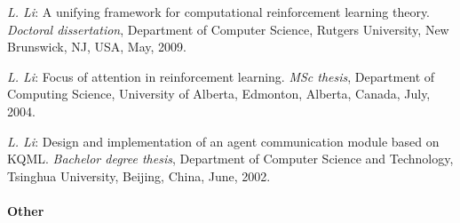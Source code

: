 \documentclass[10pt,twoside,letterpaper]{article}
\newcommand{\selffont}[1]{{\textit{#1}}}
\newcommand{\venuefont}[1]{{\textit{#1}}}
\newcommand{\negitemspace}{\vspace{1mm}}
\newcommand{\myself}{\selffont{L. Li}}
\begin{document}
\begin{compactenum}[(T1)]

\item{\myself: A unifying framework for computational reinforcement learning theory. \venuefont{Doctoral dissertation}, Department of Computer Science, Rutgers University, New Brunswick, NJ, USA, May, 2009.}

\item{\myself: Focus of attention in reinforcement learning. \venuefont{MSc thesis}, Department of Computing Science, University of Alberta, Edmonton, Alberta, Canada, July, 2004.}

\item{\myself: Design and implementation of an agent communication module based on KQML. \venuefont{Bachelor degree thesis}, Department of Computer Science and Technology, Tsinghua University, Beijing, China, June, 2002.}

\end{compactenum} \negitemspace

\paragraph{Other} \negitemspace
\end{document}
